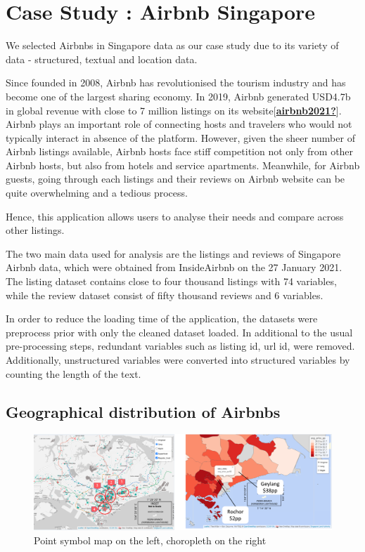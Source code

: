 \documentclass{acm_proc_article-sp}
\begin{document}
\hypertarget{case-study-airbnb-singapore}{%
\section{Case Study : Airbnb
Singapore}\label{case-study-airbnb-singapore}}

We selected Airbnbs in Singapore data as our case study due to its
variety of data - structured, textual and location data.

Since founded in 2008, Airbnb has revolutionised the tourism industry
and has become one of the largest sharing economy. In 2019, Airbnb
generated USD4.7b in global revenue with close to 7 million listings on
its
website{[}\protect\hyperlink{ref-airbnb2021}{\textbf{airbnb2021?}}{]}.
Airbnb plays an important role of connecting hosts and travelers who
would not typically interact in absence of the platform. However, given
the sheer number of Airbnb listings available, Airbnb hosts face stiff
competition not only from other Airbnb hosts, but also from hotels and
service apartments. Meanwhile, for Airbnb guests, going through each
listings and their reviews on Airbnb website can be quite overwhelming
and a tedious process.

Hence, this application allows users to analyse their needs and compare
across other listings.

The two main data used for analysis are the listings and reviews of
Singapore Airbnb data, which were obtained from InsideAirbnb on the 27
January 2021. The listing dataset contains close to four thousand
listings with 74 variables, while the review dataset consist of fifty
thousand reviews and 6 variables.

In order to reduce the loading time of the application, the datasets
were preprocess prior with only the cleaned dataset loaded. In
additional to the usual pre-processing steps, redundant variables such
as listing id, url id, were removed. Additionally, unstructured
variables were converted into structured variables by counting the
length of the text.

\hypertarget{geographical-distribution-of-airbnbs}{%
\subsection{Geographical distribution of
Airbnbs}\label{geographical-distribution-of-airbnbs}}

\begin{figure}[H]

{\centering \includegraphics[width=1\linewidth]{images/usecase_explore} 

}

\caption{Point symbol map on the left, choropleth on the right}\label{fig:unnamed-chunk-17}
\end{figure}
\end{document}
